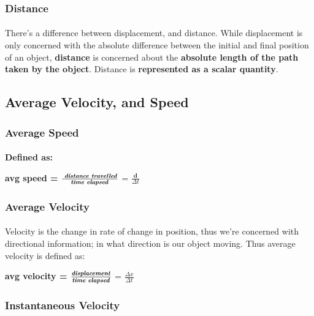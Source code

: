 \documentclass[12pt, a4paper]{article}
\begin{document}
\subsubsection{Distance}
\paragraph*{}
There's a difference between displacement, and distance. While displacement is 
only concerned with the absolute difference between the initial and final position of an object,
\textbf{distance} is concerned about the \textbf{absolute length of the path taken by the object}.
Distance is \textbf{represented as a scalar quantity}.


\subsection{Average Velocity, and Speed}

\subsubsection{Average Speed}
\paragraph*{}
\textbf{Defined as:}

{
    \centering
    \textbf{avg speed =} $\frac{\textrm{
        \textbf{\textit{distance travelled}}}}{\textrm{\textbf{\textit{time elapsed}}}}$ = $\frac{\textbf{d}}{\textbf{$\Delta t$}}$

}

\subsubsection{Average Velocity}
\paragraph*{}
Velocity is the change in rate of change in position, thus we're concerned with 
directional information; in what direction is our object moving. Thus average velocity 
is defined as:

{
    \centering
    \textbf{avg velocity =} $\frac{\textbf{\textit{displacement}}}{\textrm{\textbf{\textit{time elapsed}}}}$ = 
    {$\frac{\textbf{$\Delta x$}}{\textbf{$\Delta t$}}$}

}

\subsubsection{Instantaneous Velocity}
\end{document}
